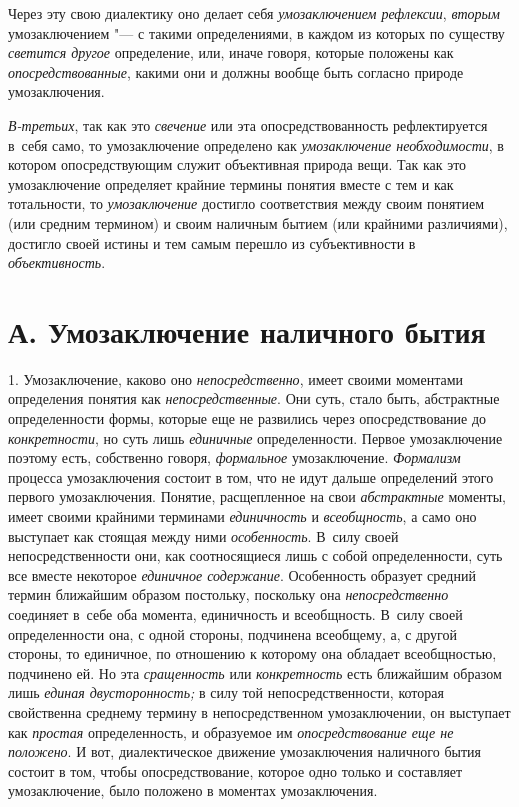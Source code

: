 Через эту свою диалектику оно делает себя
{\em умозаключением рефлексии},
{\em вторым}
умозаключением "--- с такими определениями, в
каждом из которых по существу
{\em светится другое}
определение, или, иначе говоря, которые положены как
{\em опосредствованные},
какими они и должны вообще быть согласно природе
умозаключения.

{\em В-третьих}, так как
это {\em свечение} или
эта опосредствованность рефлектируется в~себя само, то умозаключение
определено как {\em умозаключение
необходимости}, в котором опосредствующим служит объективная
природа вещи. Так как это умозаключение определяет крайние термины понятия
вместе с тем и как тотальности, то
{\em умозаключение}
достигло соответствия между своим понятием (или средним
термином) и своим наличным бытием (или крайними различиями), достигло своей
истины и тем самым перешло из субъективности в
{\em объективность}.

\section[А. Умозаключение наличного бытия]{А. Умозаключение наличного бытия}

1. Умозаключение, каково оно
{\em непосредственно},
имеет своими моментами определения понятия как
{\em непосредственные}.
Они суть, стало быть, абстрактные определенности формы,
которые еще не развились через опосредствование до
{\em конкретности}, но
суть лишь {\em единичные}
определенности. Первое умозаключение поэтому есть,
собственно говоря,
{\em формальное}
умозаключение.
{\em Формализм} процесса
умозаключения состоит в том, что не идут дальше определений этого первого
умозаключения. Понятие, расщепленное на свои
{\em абстрактные}
моменты, имеет своими крайними терминами
{\em единичность} и
{\em всеобщность}, а само
оно выступает как стоящая между ними
{\em особенность}. В~силу
своей непосредственности они, как соотносящиеся лишь с собой
определенности, суть все вместе некоторое
{\em единичное содержание}.
Особенность образует средний термин ближайшим образом
постольку, поскольку она
{\em непосредственно}
соединяет в~себе оба момента, единичность и всеобщность. В~силу своей
определенности она, с одной стороны, подчинена всеобщему, а, с
другой стороны, то единичное, по отношению к которому она обладает
всеобщностью, подчинено ей. Но эта {\em сращенность} или
{\em конкретность}
есть ближайшим образом лишь
{\em единая двусторонность;}
в силу той непосредственности, которая свойственна среднему
термину в непосредственном умозаключении, он выступает как
{\em простая}
определенность, и образуемое им
{\em опосредствование еще не положено}.
И вот, диалектическое движение умозаключения наличного бытия
состоит в том, чтобы опосредствование, которое одно только и составляет
умозаключение, было положено в моментах умозаключения.

